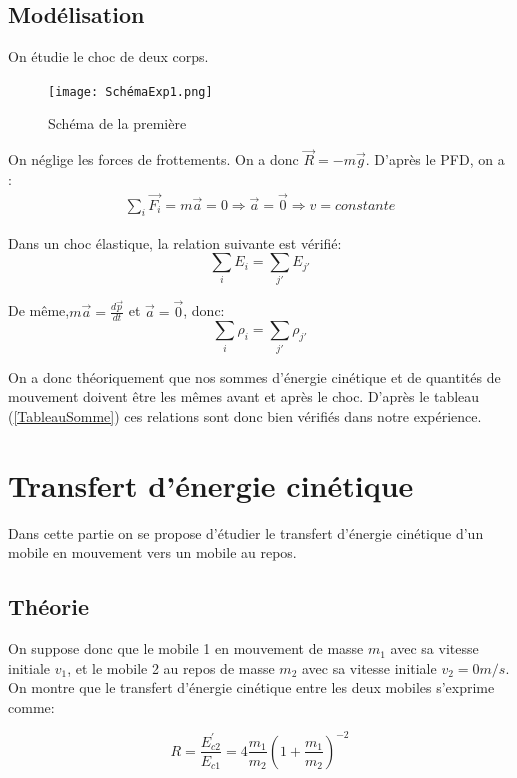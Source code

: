 \documentclass[12pt]{article}
\begin{document}
\subsection{Modélisation}

On étudie le choc de deux corps. 
\begin{figure}[!h]
	\begin{center}
		\texttt{[image: SchémaExp1.png]}
		\label{SchmExp1}
		\caption{Schéma de la première}
	\end{center}
\end{figure}

On néglige les forces de frottements. On a donc $\vec{R}=-m\vec{g}$. D'après le PFD, on a :
\begin{align*}
\sum_i\vec{F_i}=m\vec{a}=0\Rightarrow \vec{a}=\vec{0}\Rightarrow v=constante
\end{align*}

Dans un choc élastique, la relation suivante est vérifié:
\begin{equation}
\sum_i E_i=\sum_{j'}E_{j'}
\end{equation}

De même,$m\vec{a}=\frac{d\vec{p}}{dt}$ et $\vec{a}=\vec{0}$, donc:
\begin{equation}
\sum_i \rho_i=\sum_{j'}\rho_{j'}
\end{equation}

On a donc théoriquement que nos sommes d'énergie cinétique et de quantités de mouvement doivent être les mêmes avant et après le choc. D'après le tableau (\ref{TableauSomme}) ces relations sont donc bien vérifiés dans notre expérience. 

\section{Transfert d'énergie cinétique}
Dans cette partie on se propose d'étudier le transfert d'énergie cinétique d'un mobile en mouvement vers 
un mobile au repos. 

\subsection{Théorie}
On suppose donc que le mobile 1 en mouvement de masse $m_1$ avec sa vitesse initiale $v_1$, et le mobile 2 au repos de masse $m_2$ avec sa vitesse initiale
$v_2 = 0 m/s$. On montre que le transfert d'énergie cinétique entre les deux mobiles s'exprime comme:

\begin{equation}
    R = \frac{E^{'}_{c2}}{E_{c1}} = 4 \frac{m_1}{m_2} \left(1 + \frac{m_1}{m_2} \right)^{-2}
\end{equation}
\end{document}
